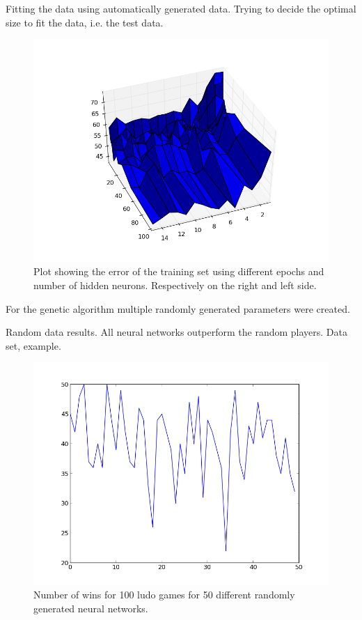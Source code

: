 \documentclass{llncs}
\begin{document}
Fitting the data using automatically generated data. Trying to decide the optimal size to fit the data, i.e. the test data.

\begin{figure}[t]
        \centering
		\includegraphics[scale=0.3]{../testing_fit_3D.png} 
        \caption{ Plot showing the error of the training set using different epochs and number of hidden neurons. Respectively on the right and left side.}\label{fig:3D}
\end{figure} 


For the genetic algorithm multiple randomly generated parameters were created.

Random data results. All neural networks outperform the random players. Data set, example.

\begin{figure}[t]
        \centering
		\includegraphics[scale=0.3]{../50_random_1.png} 
        \caption{ Number of wins for 100 ludo games for 50 different randomly generated neural networks. }\label{fig:random_50}
\end{figure} 
\end{document}
